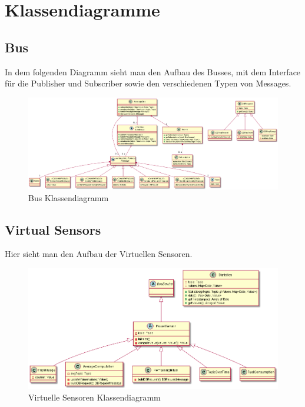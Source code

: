 \documentclass[entwurf.tex]{subfiles}
\begin{document}
\chapter{Klassendiagramme}
	\section{Bus}
		In dem folgenden Diagramm sieht man den Aufbau des Busses, mit dem Interface für die Publisher und Subscriber sowie den verschiedenen Typen von Messages.
		\begin{figure}[H]
  			\begin{center}
 				\includegraphics[width=\textwidth]{diagrams/Bus.png}
  				\caption{Bus Klassendiagramm}
  			\end{center}
  		\end{figure}
  		
  	
  	\newpage
  	\section{Virtual Sensors}
		Hier sieht man den Aufbau der Virtuellen Sensoren.
		\begin{figure}[H]
  			\begin{center}
 				\includegraphics{diagrams/VirtualSensors.png}
  				\caption{Virtuelle Sensoren Klassendiagramm}
  			\end{center}
  		\end{figure}
  		
\end{document}
